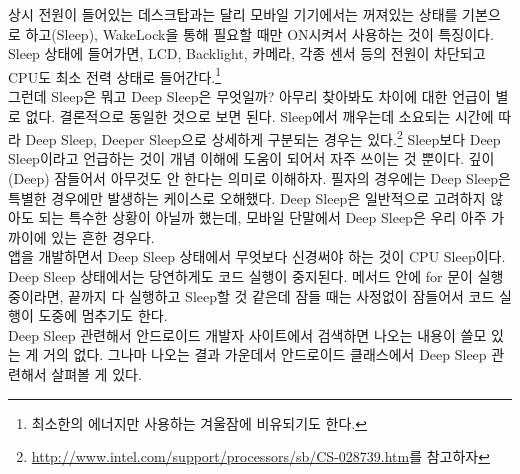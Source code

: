 상시 전원이 들어있는 데스크탑과는 달리 모바일 기기에서는 꺼져있는 상태를 기본으로 하고(Sleep), WakeLock을 통해 필요할 때만 ON시켜서 사용하는 것이 특징이다.
Sleep 상태에 들어가면, LCD, Backlight, 카메라, 각종 센서 등의 전원이 차단되고 CPU도 최소 전력 상태로 들어간다.\footnote{최소한의 에너지만 사용하는 겨울잠에 비유되기도 한다.}\\ 

그런데 Sleep은 뭐고 Deep Sleep은 무엇일까? 아무리 찾아봐도 차이에 대한 언급이 별로 없다. 결론적으로 동일한 것으로 보면 된다. 
Sleep에서 깨우는데 소요되는 시간에 따라 Deep Sleep, Deeper Sleep으로 상세하게 구분되는 경우는 있다.\footnote{\url{http://www.intel.com/support/processors/sb/CS-028739.htm}를 참고하자}
Sleep보다 Deep Sleep이라고 언급하는 것이 개념 이해에 도움이 되어서 자주 쓰이는 것 뿐이다. 
깊이(Deep) 잠들어서 아무것도 안 한다는 의미로 이해하자.
필자의 경우에는 Deep Sleep은 특별한 경우에만 발생하는 케이스로 오해했다. 
Deep Sleep은 일반적으로 고려하지 않아도 되는 특수한 상황이 아닐까 했는데, 모바일 단말에서 Deep Sleep은 우리 아주 가까이에 있는 흔한 경우다.\\

앱을 개발하면서 Deep Sleep 상태에서 무엇보다 신경써야 하는 것이 CPU Sleep이다.
Deep Sleep 상태에서는 당연하게도 코드 실행이 중지된다. 메서드 안에 for 문이 실행 중이라면, 끝까지 다 실행하고 Sleep할 것 같은데 잠들 때는 사정없이 잠들어서 코드 실행이 도중에 멈추기도 한다.\\

Deep Sleep 관련해서 안드로이드 개발자 사이트에서 검색하면 나오는 내용이 쓸모 있는 게 거의 없다. 그나마 나오는 결과 가운데서 안드로이드 클래스에서 Deep Sleep 관련해서 살펴볼 게 있다.

